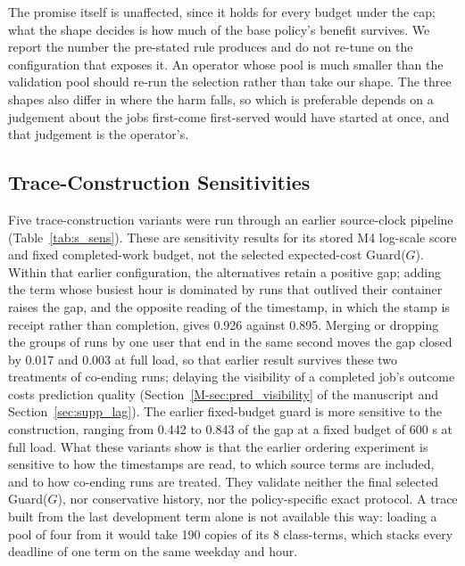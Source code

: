 \documentclass[mathematics,supfile,submit,moreauthors]{Definitions/mdpi}
\newcommand{\devnum}[1]{#1}
\begin{document}
The promise itself is unaffected, since it holds for every budget under the cap; what
the shape decides is how much of the base policy's benefit survives. We report the
number the pre-stated rule produces and do not re-tune on the configuration that
exposes it. An operator whose pool is much smaller than the validation pool should
re-run the selection rather than take our shape. The three shapes also differ in where
the harm falls, so which is preferable depends on a judgement about the jobs first-come
first-served would have started at once, and that judgement is the operator's.


\subsection{Trace-Construction Sensitivities}
\label{sec:supp_sens}

Five trace-construction variants were run through an earlier source-clock pipeline
(Table~\ref{tab:s_sens}). These are sensitivity results for its stored M4 log-scale
score and fixed completed-work budget, not the selected expected-cost Guard($G$).
Within that earlier configuration, the alternatives retain a positive gap; adding the term whose busiest
hour is dominated by runs that outlived their container raises the gap, and the opposite reading
of the timestamp, in which the stamp is receipt rather than completion, gives
\devnum{0.926} against \devnum{0.895}. Merging or dropping the groups of runs by one user that
end in the same second moves the gap closed by \devnum{0.017} and \devnum{0.003} at full load,
so that earlier result survives these two treatments of co-ending runs;
delaying the visibility of a completed job's outcome costs prediction quality
(Section~\ref*{M-sec:pred_visibility} of the manuscript and Section~\ref{sec:supp_lag}). The earlier fixed-budget guard is more sensitive to the
construction, ranging from \devnum{0.442} to \devnum{0.843} of the gap at a fixed budget of
\devnum{600} s at full load. What these variants show is that the earlier ordering
experiment is sensitive to how the timestamps are read, to which source terms are
included, and to how co-ending runs are treated. They validate neither the final
selected Guard($G$), nor conservative history, nor the policy-specific exact protocol.
A trace built from the last development term alone is not available this way: loading a
pool of four from it would take \devnum{190} copies of its \devnum{8} class-terms, which
stacks every deadline of one term on the same weekday and hour.
\end{document}
